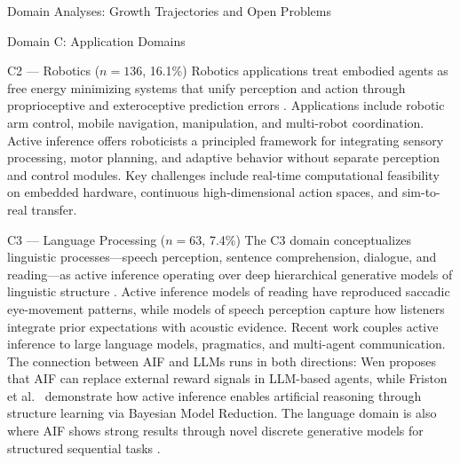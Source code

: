 \documentclass[
  ignorenonframetext,
]{beamer}
\begin{document}
\begin{frame}{Domain Analyses: Growth Trajectories and Open Problems
\label{sec:subfield_analyses}}
\begin{block}{Domain C: Application Domains}
\begin{block}{C2 --- Robotics (\(n = 136\), 16.1\%)}
\protect{}\label{c2-robotics-n-136-16.1}
Robotics applications treat embodied agents as free energy minimizing
systems that unify perception and action through proprioceptive and
exteroceptive prediction errors \citep{lanillos2021active}. Applications
include robotic arm control, mobile navigation, manipulation, and
multi-robot coordination. Active inference offers roboticists a
principled framework for integrating sensory processing, motor planning,
and adaptive behavior without separate perception and control modules.
Key challenges include real-time computational feasibility on embedded
hardware, continuous high-dimensional action spaces, and sim-to-real
transfer.
\end{block}

\begin{block}{C3 --- Language Processing (\(n = 63\), 7.4\%)}
\protect{}\label{c3-language-processing-n-63-7.4}
The C3 domain conceptualizes linguistic processes---speech perception,
sentence comprehension, dialogue, and reading---as active inference
operating over deep hierarchical generative models of linguistic
structure \citep{friston2020generative}. Active inference models of
reading have reproduced saccadic eye-movement patterns, while models of
speech perception capture how listeners integrate prior expectations
with acoustic evidence. Recent work couples active inference to large
language models, pragmatics, and multi-agent communication. The
connection between AIF and LLMs runs in both directions: Wen
\citep{wen2025missing} proposes that AIF can replace external reward
signals in LLM-based agents, while Friston et
al.~\citep{friston2025active} demonstrate how active inference enables
artificial reasoning through structure learning via Bayesian Model
Reduction. The language domain is also where AIF shows strong results
through novel discrete generative models for structured sequential tasks
\citep{millidge2024retrospective}.
\end{block}


\end{block}
\end{frame}
\end{document}
